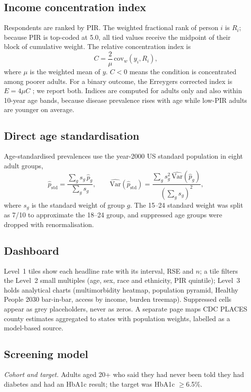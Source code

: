 \subsection{Income concentration index}
Respondents are ranked by PIR. The weighted fractional rank of person $i$ is $R_i$; because PIR is top-coded at 5.0, all tied values receive the midpoint of their block of cumulative weight. The relative concentration index is
\begin{equation}
C = \frac{2}{\mu}\,\mathrm{cov}_w\!\left(y_i, R_i\right),
\end{equation}
where $\mu$ is the weighted mean of $y$. $C<0$ means the condition is concentrated among poorer adults. For a binary outcome, the Erreygers corrected index is $E=4\mu C$ \cite{erreygers2009}; we report both. Indices are computed for adults only and also within 10-year age bands, because disease prevalence rises with age while low-PIR adults are younger on average.

\subsection{Direct age standardisation}
Age-standardised prevalences use the year-2000 US standard population in eight adult groups,
\begin{equation}
\hat p_{\mathrm{std}} = \frac{\sum_g s_g\,\hat p_g}{\sum_g s_g},\qquad
\widehat{\mathrm{Var}}(\hat p_{\mathrm{std}}) = \frac{\sum_g s_g^2\,\widehat{\mathrm{Var}}(\hat p_g)}{\left(\sum_g s_g\right)^2},
\end{equation}
where $s_g$ is the standard weight of group $g$. The 15--24 standard weight was split as 7/10 to approximate the 18--24 group, and suppressed age groups were dropped with renormalisation.

\subsection{Dashboard}
Level~1 tiles show each headline rate with its interval, RSE and $n$; a tile filters the Level~2 small multiples (age, sex, race and ethnicity, PIR quintile); Level~3 holds analytical charts (multimorbidity heatmap, population pyramid, Healthy People 2030 bar-in-bar, access by income, burden treemap). Suppressed cells appear as grey placeholders, never as zeros. A separate page maps CDC PLACES county estimates aggregated to states with population weights, labelled as a model-based source.

\subsection{Screening model}
\textit{Cohort and target.} Adults aged 20+ who said they had never been told they had diabetes and had an HbA1c result; the target was HbA1c $\geq$6.5\%.

